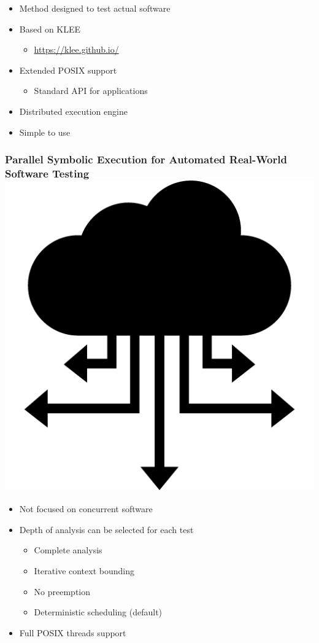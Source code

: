 \documentclass{beamer}
\begin{document}
\begin{frame}
		\begin{itemize}
			\item Method designed to test actual software
			\item Based on KLEE
			\begin{itemize}
				\item \url{https://klee.github.io/}
			\end{itemize}
			\item Extended POSIX support
			\begin{itemize}
				\item Standard API for applications
			\end{itemize}
			\item Distributed execution engine
			\item Simple to use
		\end{itemize}
	\end{frame}
	
	\begin{frame}
		\frametitle{Parallel Symbolic Execution for Automated Real-World Software Testing \cite{base3} \includegraphics[scale=0.025]{distributed}}
		
		\begin{itemize}
			\item Not focused on concurrent software
			\item Depth of analysis can be selected for each test
			\begin{itemize}
				\item Complete analysis
				\item Iterative context bounding
				\item No preemption
				\item Deterministic scheduling (default)
			\end{itemize}
			\item Full POSIX threads support
		\end{itemize}
	\end{frame}
	
\end{document}
